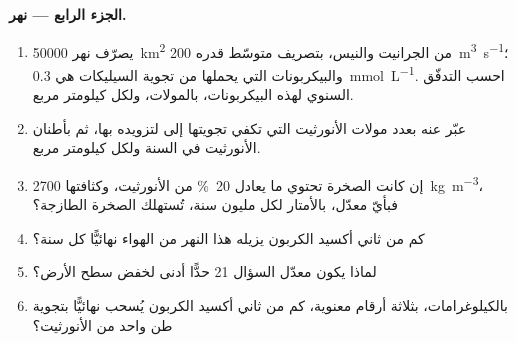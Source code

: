 \begin{problem}
\noindent\textbf{الجزء الرابع --- نهر.}
\begin{enumerate}[resume]
  \item يصرّف نهر \qty{50000}{km^2} من الجرانيت والنيس، بتصريف متوسّط قدره \qty{200}{m^3.s^{-1}}؛ والبيكربونات التي يحملها من تجوية السيليكات هي \qty{0.3}{mmol.L^{-1}}. احسب التدفّق السنوي لهذه البيكربونات، بالمولات، ولكل كيلومتر مربع.
  \item عبّر عنه بعدد مولات الأنورثيت التي تكفي تجويتها إلى  لتزويده بها، ثم بأطنان الأنورثيت في السنة ولكل كيلومتر مربع.
  \item إن كانت الصخرة تحتوي ما يعادل \qty{20}{\percent} من الأنورثيت، وكثافتها \qty{2700}{kg.m^{-3}}، فبأيّ معدّل، بالأمتار لكل مليون سنة، تُستهلك الصخرة الطازجة؟
  \item كم من ثاني أكسيد الكربون يزيله هذا النهر من الهواء نهائيًّا كل سنة؟
  \item لماذا يكون معدّل السؤال 21 حدًّا أدنى لخفض سطح الأرض؟
  \item بالكيلوغرامات، بثلاثة أرقام معنوية، كم من ثاني أكسيد الكربون يُسحب نهائيًّا بتجوية طن واحد من الأنورثيت؟
\end{enumerate}
\end{problem}
